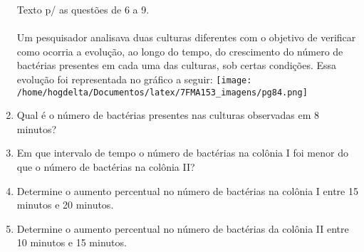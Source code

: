 \documentclass[a4paper,14pt]{article}
\begin{document}
\begin{multicols}{2}
\begin{enumerate}
	    	Texto p/ as questões de 6 a 9. \\\\
	    	Um pesquisador analisava duas culturas diferentes com o objetivo de verificar como ocorria a evolução, ao longo do tempo, do crescimento do número de bactérias presentes em cada uma das culturas, sob certas condições. Essa evolução foi representada no gráfico a seguir: 
	    	\texttt{[image: /home/hogdelta/Documentos/latex/7FMA153\_imagens/pg84.png]}
	    	\item Qual é o número de bactérias presentes nas culturas observadas em 8 minutos?
	    	\item Em que intervalo de tempo o número de bactérias na colônia I foi menor do que o número de bactérias na colônia II?
	    	\item Determine o aumento percentual no número de bactérias na colônia I entre 15 minutos e 20 minutos.
	    	\item Determine o aumento percentual no número de bactérias da colônia II entre 10 minutos e 15 minutos.

\end{enumerate}
\end{multicols}
\end{document}
